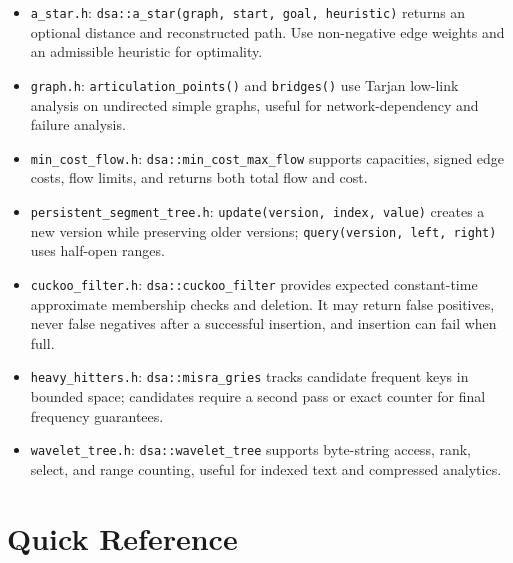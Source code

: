 \documentclass[11pt]{article}
\begin{document}
\begin{itemize}
\item \texttt{a\_star.h}: \texttt{dsa::a\_star(graph, start, goal, heuristic)} returns an optional distance and reconstructed path. Use non-negative edge weights and an admissible heuristic for optimality.
\item \texttt{graph.h}: \texttt{articulation\_points()} and \texttt{bridges()} use Tarjan low-link analysis on undirected simple graphs, useful for network-dependency and failure analysis.
\item \texttt{min\_cost\_flow.h}: \texttt{dsa::min\_cost\_max\_flow} supports capacities, signed edge costs, flow limits, and returns both total flow and cost.
\item \texttt{persistent\_segment\_tree.h}: \texttt{update(version, index, value)} creates a new version while preserving older versions; \texttt{query(version, left, right)} uses half-open ranges.
\item \texttt{cuckoo\_filter.h}: \texttt{dsa::cuckoo\_filter} provides expected constant-time approximate membership checks and deletion. It may return false positives, never false negatives after a successful insertion, and insertion can fail when full.
\item \texttt{heavy\_hitters.h}: \texttt{dsa::misra\_gries} tracks candidate frequent keys in bounded space; candidates require a second pass or exact counter for final frequency guarantees.
\item \texttt{wavelet\_tree.h}: \texttt{dsa::wavelet\_tree} supports byte-string access, rank, select, and range counting, useful for indexed text and compressed analytics.
\end{itemize}

\section{Quick Reference}
\end{document}

